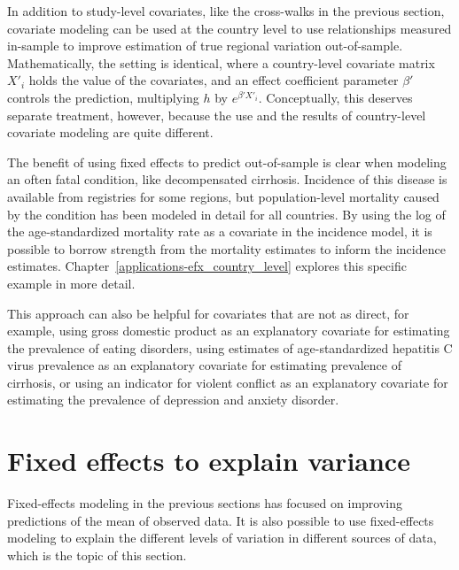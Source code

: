 In addition to study-level covariates, like the cross-walks in the
previous section, covariate modeling can be used at the country level
to use relationships measured in-sample to improve estimation of true
regional variation out-of-sample.  Mathematically, the setting is
identical, where a country-level covariate matrix $X'_i$ holds the
value of the covariates, and an effect coefficient parameter $\beta'$
controls the prediction, multiplying $h$ by $e^{\beta' X'_i}$.
Conceptually, this deserves separate treatment, however, because the
use and the results of country-level covariate modeling are quite different.

The benefit of using fixed effects to predict out-of-sample
is clear when modeling an often fatal condition, like
decompensated cirrhosis.  Incidence of this disease is available from
registries for some regions, but population-level mortality caused by
the condition has been modeled in detail for all
countries.\cite{foreman_modeling_2012} By using the log of the
age-standardized mortality rate as a covariate in the incidence model,
it is possible to borrow strength from the mortality estimates to
inform the incidence
estimates. Chapter~\ref{applications-efx_country_level} explores this
specific example in more detail.

This approach can also be helpful for covariates that are not as
direct, for example, using gross domestic product as an explanatory
covariate for estimating the prevalence of eating disorders, using
estimates of age-standardized hepatitis C virus prevalence as an
explanatory covariate for estimating prevalence of cirrhosis, or using
an indicator for violent conflict as an explanatory covariate for
estimating the prevalence of depression and anxiety disorder.



\section{Fixed effects to explain variance}
Fixed-effects modeling in the previous sections has focused on
improving predictions of the mean of observed data.  It is also
possible to use fixed-effects modeling to explain the
different levels of variation in different sources of data, which is
the topic of this section.

